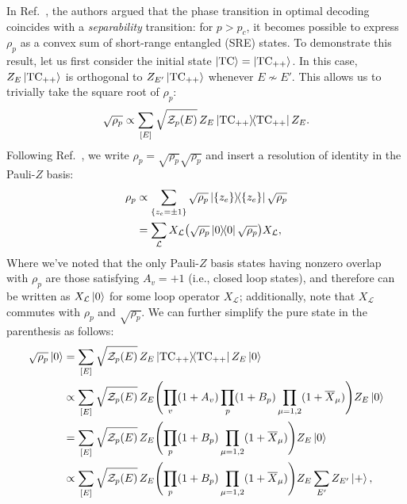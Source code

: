 In Ref.~, the authors argued that the phase transition in optimal decoding coincides with a \emph{separability} transition: for $p > p_c$, it becomes possible to express $\rho_p$ as a convex sum of short-range entangled (SRE) states. To demonstrate this result, let us first  consider the initial state $\ket{\text{TC}} = \ket{\text{TC}_{++}}$. In this case, $Z_E \ket{\text{TC}_{++}}$ is orthogonal to $Z_{E'} \ket{\text{TC}_{++}}$ whenever $E \nsim E'$. This allows us to trivially take the square root of $\rho_p$:
\begin{equation}
    \sqrt{\rho_p} \propto \sum_{[E]} \sqrt{\mathcal{Z}_p(E)} \, Z_E \dyad{\TC_{++}} Z_E .
\end{equation}
Following Ref.~, we write $\rho_p = \sqrt{\rho_p} \sqrt{\rho_p}$ and insert a resolution of identity in the Pauli-$Z$ basis:
\begin{equation}
    \begin{split}
        \rho_p &\propto \sum_{\qty{z_e = \pm 1}} \sqrt{\rho_p} \dyad{\qty{z_e}} \sqrt{\rho_p} \\
        &= \sum_{\mathcal{L}} X_{\mathcal{L}} \qty(\sqrt{\rho_p} \dyad{0} \sqrt{\rho_p} ) X_{\mathcal{L}} ,
    \end{split}
\end{equation}
Where we've noted that the only Pauli-$Z$ basis states having nonzero overlap with $\rho_p$ are those satisfying $A_v = +1$ (i.e., closed loop states), and therefore can be written as $X_{\mathcal{L}} \ket{0}$ for some loop operator $X_{\mathcal{L}}$; additionally, note that $X_{\mathcal{L}}$ commutes with $\rho_p$ and $\sqrt{\rho_p}$. We can further simplify the pure state in the parenthesis as follows:
\begin{subequations}
    \begin{align}
        \sqrt{\rho_p} \ket{0} &= \sum_{[E]} \sqrt{\mathcal{Z}_p(E)} \, Z_E \dyad{\TC_{++}} Z_E \ket{0} \\
        &\propto \sum_{[E]} \sqrt{\mathcal{Z}_p(E)} \, Z_E \qty( \prod_v (1 + A_v) \prod_p(1 + B_p) \prod_{\mu = 1, 2}( 1 + \overline{X}_{\mu} ) ) Z_E \ket{0} \\
        &= \sum_{[E]} \sqrt{\mathcal{Z}_p(E)} \, Z_E \qty( \prod_p(1 + B_p) \prod_{\mu = 1, 2}( 1 + \overline{X}_{\mu} ) ) Z_E \ket{0} \\
        &\propto \sum_{[E]} \sqrt{\mathcal{Z}_p(E)} \, Z_E \qty( \prod_p(1 + B_p) \prod_{\mu = 1, 2}( 1 + \overline{X}_{\mu} ) ) Z_E \sum_{E'} Z_{E'} \ket{+} ,
    \end{align}
\end{subequations}
